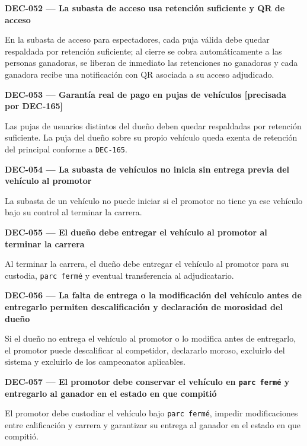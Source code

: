 \documentclass[10pt,letterpaper]{article}
\begin{document}
\noindent\textbf{DEC-052 --- La subasta de acceso usa retención suficiente y QR de acceso}\par
En la subasta de acceso para espectadores, cada puja válida debe quedar respaldada por retención suficiente; al cierre se cobra automáticamente a las personas ganadoras, se liberan de inmediato las retenciones no ganadoras y cada ganadora recibe una notificación con QR asociada a su acceso adjudicado.\par\vspace{0.45em}
\noindent\textbf{DEC-053 --- Garantía real de pago en pujas de vehículos [precisada por DEC-165]}\par
Las pujas de usuarios distintos del dueño deben quedar respaldadas por retención suficiente. La puja del dueño sobre su propio vehículo queda exenta de retención del principal conforme a \texttt{DEC-165}.\par\vspace{0.45em}
\noindent\textbf{DEC-054 --- La subasta de vehículos no inicia sin entrega previa del vehículo al promotor}\par
La subasta de un vehículo no puede iniciar si el promotor no tiene ya ese vehículo bajo su control al terminar la carrera.\par\vspace{0.45em}
\noindent\textbf{DEC-055 --- El dueño debe entregar el vehículo al promotor al terminar la carrera}\par
Al terminar la carrera, el dueño debe entregar el vehículo al promotor para su custodia, \texttt{parc fermé} y eventual transferencia al adjudicatario.\par\vspace{0.45em}
\noindent\textbf{DEC-056 --- La falta de entrega o la modificación del vehículo antes de entregarlo permiten descalificación y declaración de morosidad del dueño}\par
Si el dueño no entrega el vehículo al promotor o lo modifica antes de entregarlo, el promotor puede descalificar al competidor, declararlo moroso, excluirlo del sistema y excluirlo de los campeonatos aplicables.\par\vspace{0.45em}
\noindent\textbf{DEC-057 --- El promotor debe conservar el vehículo en \texttt{parc fermé} y entregarlo al ganador en el estado en que compitió}\par
El promotor debe custodiar el vehículo bajo \texttt{parc fermé}, impedir modificaciones entre calificación y carrera y garantizar su entrega al ganador en el estado en que compitió.\par\vspace{0.45em}
\end{document}
